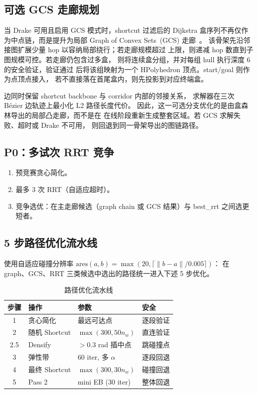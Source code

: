 \documentclass[journal]{IEEEtran}
\begin{document}
\subsection{可选 GCS 走廊规划}

当 Drake 可用且启用 GCS 模式时，shortcut 过滤后的 Dijkstra
盒序列不再仅作为中点链，而是提升为局部
Graph of Convex Sets~(GCS) 走廊~\cite{marcucci2024motion}。
该骨架先沿邻接图扩展少量 hop 以容纳局部绕行；若走廊规模超过
上限，则递减 hop 数直到子图规模可控。若走廊仍包含过多盒，
则将连续盒分组，并对每组 hull 执行深度 6 的安全验证，验证通过
后将该组映射为一个 HPolyhedron 顶点。start/goal 则作为点顶点接入，
若不直接落在首尾盒内，则先投影到对应终端盒。

边同时保留 shortcut backbone 与 corridor 内部的邻接关系，
求解器在三次 B\'ezier 边轨迹上最小化 L2 路径长度代价。
因此，这一可选分支优化的是由盒森林导出的局部凸走廊，而不是在
在线阶段重新生成整套区域。若 GCS 求解失败、超时或 Drake 不可用，
则回退到同一骨架导出的图链路径。

\subsection{P0：多试次 RRT 竞争}

\begin{enumerate}[nosep]
  \item 预竞赛贪心简化。
  \item 最多 3 次 RRT（自适应超时）。
  \item 竞争选优：在主走廊候选（graph chain 或 GCS 结果）与
    best\_rrt 之间选更短者。
\end{enumerate}

\subsection{5 步路径优化流水线}

使用自适应碰撞分辨率
$\mathrm{ares}(a,b) = \max(20, \lceil\|b-a\|/0.005\rceil)$：
在 graph、GCS、RRT 三类候选中选出的路径统一进入下述 5 步优化。

\begin{table}[ht]
\centering
\caption{路径优化流水线}
\label{tab:pipeline}
\begin{tabular}{@{}clll@{}}
\toprule
\textbf{步骤} & \textbf{操作} & \textbf{参数} & \textbf{安全} \\
\midrule
1 & 贪心简化 & 最远可达点 & 逐段验证 \\
2 & 随机 Shortcut & $\max(300, 50 n_w)$ & 直连验证 \\
2.5 & Densify & $> 0.3$ rad 插中点 & 跳碰撞点 \\
3 & 弹性带 & 60 iter, 多 $\alpha$ & 逐段回退 \\
4 & 最终 Shortcut & $\max(300, 30 n_w)$ & 碰撞回退 \\
5 & Pass 2 & mini EB (30 iter) & 整体回退 \\
\bottomrule
\end{tabular}
\end{table}
\end{document}
